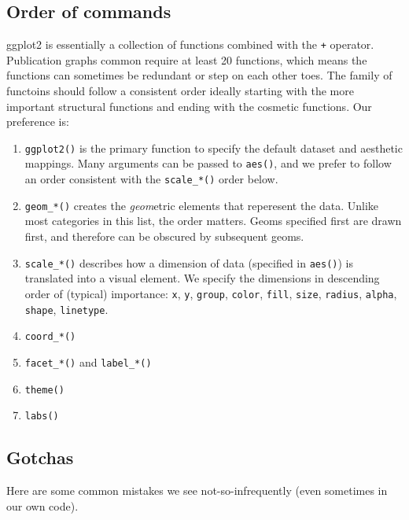 \documentclass[
]{book}
\providecommand{\tightlist}{%
  \setlength{\itemsep}{0pt}\setlength{\parskip}{0pt}}
\begin{document}
\hypertarget{order-of-commands}{%
\subsection{Order of commands}\label{order-of-commands}}

ggplot2 is essentially a collection of functions combined with the \texttt{+} operator. Publication graphs common require at least 20 functions, which means the functions can sometimes be redundant or step on each other toes. The family of functoins should follow a consistent order ideally starting with the more important structural functions and ending with the cosmetic functions. Our preference is:

\begin{enumerate}
\def\labelenumi{\arabic{enumi}.}
\tightlist
\item
  \texttt{ggplot2()} is the primary function to specify the default dataset and aesthetic mappings. Many arguments can be passed to \texttt{aes()}, and we prefer to follow an order consistent with the \texttt{scale\_*()} order below.
\item
  \texttt{geom\_*()} creates the \emph{geom}etric elements that reperesent the data. Unlike most categories in this list, the order matters. Geoms specified first are drawn first, and therefore can be obscured by subsequent geoms.
\item
  \texttt{scale\_*()} describes how a dimension of data (specified in \texttt{aes()}) is translated into a visual element. We specify the dimensions in descending order of (typical) importance: \texttt{x}, \texttt{y}, \texttt{group}, \texttt{color}, \texttt{fill}, \texttt{size}, \texttt{radius}, \texttt{alpha}, \texttt{shape}, \texttt{linetype}.
\item
  \texttt{coord\_*()}
\item
  \texttt{facet\_*()} and \texttt{label\_*()}
\item
  \texttt{theme()}
\item
  \texttt{labs()}
\end{enumerate}

\hypertarget{gotchas}{%
\subsection{Gotchas}\label{gotchas}}

Here are some common mistakes we see not-so-infrequently (even sometimes in our own code).
\end{document}
